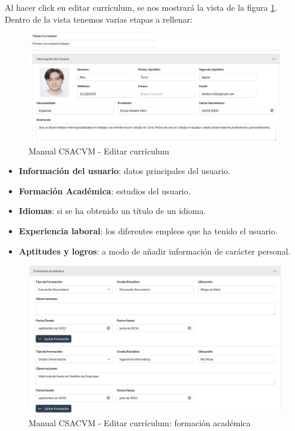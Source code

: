 Al hacer click en editar currículum, se nos mostrará la vista de la figura \ref{manualEditar}. Dentro de la vista tenemos varias etapas a rellenar:
\begin{figure}
    \centering
    \includegraphics[width=\linewidth]{img/ManualUsuario/Manual12.png}
    \caption{Manual CSACVM - Editar currículum}
    \label{manualEditar}
\end{figure}

\begin{itemize}
    \item \textbf{Información del usuario}: datos principales del usuario.
    \item \textbf{Formación Académica}: estudios del usuario.
    \item \textbf{Idiomas}: si se ha obtenido un título de un idioma.
    \item \textbf{Experiencia laboral}: los diferentes empleos que ha tenido el usuario.
    \item \textbf{Aptitudes y logros}: a modo de añadir información de carácter personal.
\end{itemize}


\begin{figure}
    \centering
    \includegraphics[width=\linewidth]{img/ManualUsuario/Manual13.png}
    \caption{Manual CSACVM - Editar currículum: formación académica}
    
\end{figure}


